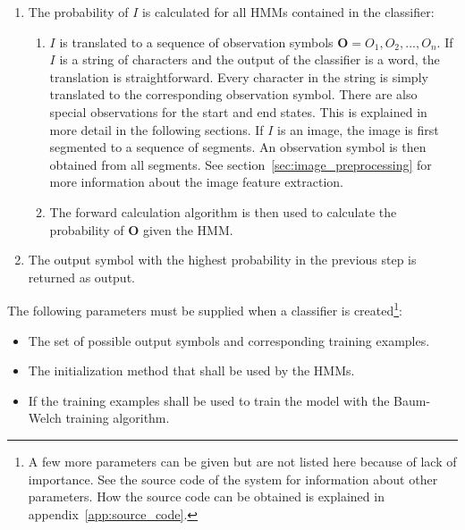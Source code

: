 \begin{enumerate}
  \item The probability of $I$ is calculated for all HMMs contained in the classifier:
    \begin{enumerate}
      \item $I$ is translated to a sequence of observation symbols $\mathbf{O} = O_{1},O_{2},...,O_{n}$. 
      If $I$ is a string of characters and the output of the classifier is a word, the translation is straightforward. 
      Every character in the string is simply translated to the corresponding observation symbol. 
      There are also special observations for the start and end states. 
      This is explained in more detail in the following sections. 
      If $I$ is an image, the image is first segmented to a sequence of segments. 
      An observation symbol is then obtained from all segments. 
      See section~\ref{sec:image_preprocessing} for more information about the image feature extraction.
      \item The forward calculation algorithm \cite{Rabiner1989} is then used to calculate the probability of $\mathbf{O}$ given the HMM.
    \end{enumerate}
  \item The output symbol with the highest probability in the previous step is returned as output.
\end{enumerate}
 
The following parameters must be supplied when a classifier is created\footnote{A few more parameters can be given but are not listed here because of lack of importance. See the source code of the system for information about other parameters. How the source code can be obtained is explained in appendix~\ref{app:source_code}.}:
\begin{itemize}
 \item The set of possible output symbols and corresponding training examples.
 \item The initialization method that shall be used by the HMMs.
 \item If the training examples shall be used to train the model with the Baum-Welch \cite{Rabiner1989} training algorithm.
\end{itemize}
